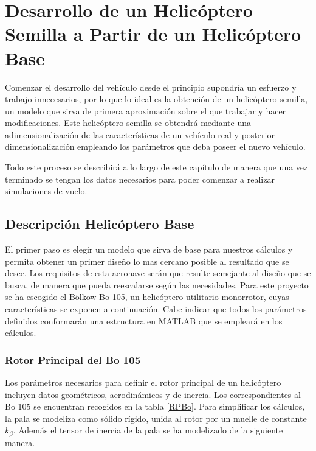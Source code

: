 \thispagestyle{empty}

\chapter{Desarrollo de un Helicóptero Semilla a Partir de un Helicóptero Base}


Comenzar el desarrollo del vehículo desde el principio supondría un esfuerzo y trabajo innecesarios, por lo que lo ideal es la obtención de un helicóptero semilla, un modelo que sirva de primera aproximación sobre el que trabajar y hacer modificaciones. Este helicóptero semilla se obtendrá mediante una adimensionalización de las características de un vehículo real y posterior dimensionalización empleando los parámetros que deba poseer el nuevo vehículo.

Todo este proceso se describirá a lo largo de este capítulo de manera que una vez terminado se tengan los datos necesarios para poder comenzar a realizar simulaciones de vuelo.

\section{Descripción Helicóptero Base}

El primer paso es elegir un modelo que sirva de base para nuestros cálculos y permita obtener un primer diseño lo mas cercano posible al resultado que se desee. Los requisitos de esta aeronave serán que resulte semejante al diseño que se busca, de manera que pueda reescalarse según las necesidades. Para este proyecto se ha escogido el Bölkow Bo 105, un helicóptero utilitario monorrotor, cuyas características se exponen a continuación. Cabe indicar que todos los parámetros definidos conformarán una estructura en MATLAB que se empleará en los cálculos.

\subsection{Rotor Principal del Bo 105}

Los parámetros necesarios para definir el rotor principal de un helicóptero incluyen datos geométricos, aerodinámicos y de inercia. Los correspondientes al Bo 105 se encuentran recogidos en la tabla \ref{RPBo}.
Para simplificar los cálculos, la pala se modeliza como sólido rígido, unida al rotor por un muelle de constante $k_\beta$.
Además el tensor de inercia de la pala se ha modelizado de la siguiente manera.

